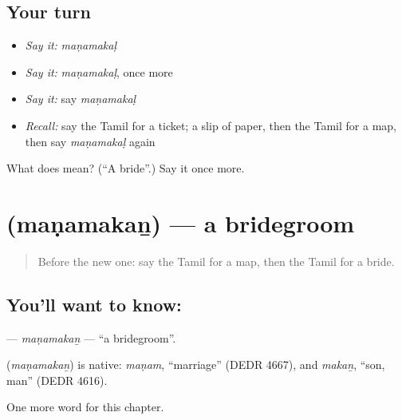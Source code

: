 \subsection*{Your turn}
\begin{itemize}
\raggedright
  \item \emph{Say it:} \emph{maṇamakaḷ}
  \item \emph{Say it:} \emph{maṇamakaḷ}, once more
  \item \emph{Say it:} say \emph{maṇamakaḷ}
  \item \emph{Recall:} say the Tamil for a ticket; a slip of paper, then the Tamil for a map, then say \emph{maṇamakaḷ} again
\end{itemize}

\begin{tcolorbox}[breakable,colback=teal!4,colframe=teal!35!black,title={Before you move on}]
What does  mean? (\textquotedblleft{}A bride\textquotedblright{}.) Say it once more.
\end{tcolorbox}
\section[\texorpdfstring{\ta{மணமகன்} (maṇamakaṉ)}{மணமகன் (maṇamakaṉ)}]{ (maṇamakaṉ) — a bridegroom}

\label{lesson:TA-C217-manamakan}



\begin{quote}
Before the new one: say the Tamil for a map, then the Tamil for a bride.
\end{quote}

\subsection*{You'll want to know: }
\textbf{} — \emph{maṇamakaṉ} — \textquotedblleft{}a bridegroom\textquotedblright{}.

\begin{cousinweb}
\textbf{} (\emph{maṇamakaṉ}) is native: \emph{maṇam}, \textquotedblleft{}marriage\textquotedblright{} (DEDR 4667), and \emph{makaṉ}, \textquotedblleft{}son, man\textquotedblright{} (DEDR 4616).
\end{cousinweb}

\begin{grammarlens}[title={What you've built}]
One more word for this chapter.
\end{grammarlens}

